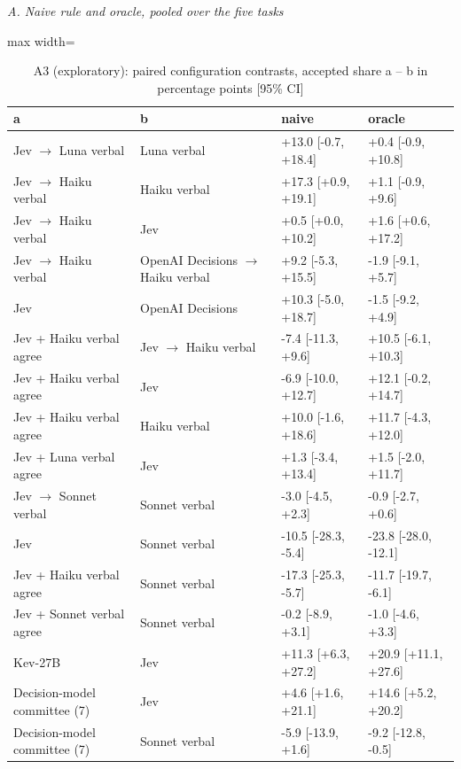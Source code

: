 \begin{table}[t]
\centering
\small
\caption{A3 (exploratory): paired configuration contrasts, accepted share a -- b in percentage points [95\% CI]}
\label{tab:tab09_cascade_contrasts}
\par\textit{A. Naive rule and oracle, pooled over the five tasks}\par\smallskip
\begin{adjustbox}{max width=\linewidth}
\begin{tabular}{llll}
\toprule
a & b & naive & oracle \\
\midrule
Jev $\rightarrow$ Luna verbal & Luna verbal & +13.0 [-0.7, +18.4] & +0.4 [-0.9, +10.8] \\
Jev $\rightarrow$ Haiku verbal & Haiku verbal & +17.3 [+0.9, +19.1] & +1.1 [-0.9, +9.6] \\
Jev $\rightarrow$ Haiku verbal & Jev & +0.5 [+0.0, +10.2] & +1.6 [+0.6, +17.2] \\
Jev $\rightarrow$ Haiku verbal & OpenAI Decisions $\rightarrow$ Haiku verbal & +9.2 [-5.3, +15.5] & -1.9 [-9.1, +5.7] \\
Jev & OpenAI Decisions & +10.3 [-5.0, +18.7] & -1.5 [-9.2, +4.9] \\
Jev + Haiku verbal agree & Jev $\rightarrow$ Haiku verbal & -7.4 [-11.3, +9.6] & +10.5 [-6.1, +10.3] \\
Jev + Haiku verbal agree & Jev & -6.9 [-10.0, +12.7] & +12.1 [-0.2, +14.7] \\
Jev + Haiku verbal agree & Haiku verbal & +10.0 [-1.6, +18.6] & +11.7 [-4.3, +12.0] \\
Jev + Luna verbal agree & Jev & +1.3 [-3.4, +13.4] & +1.5 [-2.0, +11.7] \\
Jev $\rightarrow$ Sonnet verbal & Sonnet verbal & -3.0 [-4.5, +2.3] & -0.9 [-2.7, +0.6] \\
Jev & Sonnet verbal & -10.5 [-28.3, -5.4] & -23.8 [-28.0, -12.1] \\
Jev + Haiku verbal agree & Sonnet verbal & -17.3 [-25.3, -5.7] & -11.7 [-19.7, -6.1] \\
Jev + Sonnet verbal agree & Sonnet verbal & -0.2 [-8.9, +3.1] & -1.0 [-4.6, +3.3] \\
Kev-27B & Jev & +11.3 [+6.3, +27.2] & +20.9 [+11.1, +27.6] \\
Decision-model committee (7) & Jev & +4.6 [+1.6, +21.1] & +14.6 [+5.2, +20.2] \\
Decision-model committee (7) & Sonnet verbal & -5.9 [-13.9, +1.6] & -9.2 [-12.8, -0.5] \\

\end{tabular}
\end{adjustbox}
\end{table}
